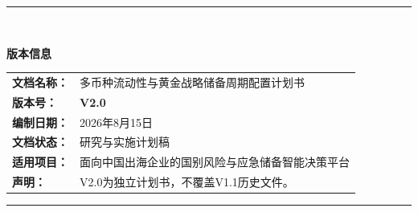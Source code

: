\documentclass[UTF8,fontset=windows,12pt,openany]{ctexbook}
\begin{document}
\clearpage
\thispagestyle{empty}
\null
\vfill
\begin{center}
  {\color{OceanBlue}\rule{0.72\textwidth}{1pt}}\\[1.0cm]
  {\LARGE\bfseries\color{DeepNavy}版本信息\par}
  \vspace{0.9cm}
  \begin{tabular}{>{\bfseries}p{3.5cm}p{8.0cm}}
  文档名称： & 多币种流动性与黄金战略储备周期配置计划书\\[0.35cm]
  版本号： & \textbf{V2.0}\\[0.35cm]
  编制日期： & 2026年8月15日\\[0.35cm]
  文档状态： & 研究与实施计划稿\\[0.35cm]
  适用项目： & 面向中国出海企业的国别风险与应急储备智能决策平台\\[0.35cm]
  声明： & V2.0为独立计划书，不覆盖V1.1历史文件。\\
  \end{tabular}
  \vspace{1.0cm}
  {\color{OceanBlue}\rule{0.72\textwidth}{1pt}}
\end{center}
\vfill
\null
\end{document}
